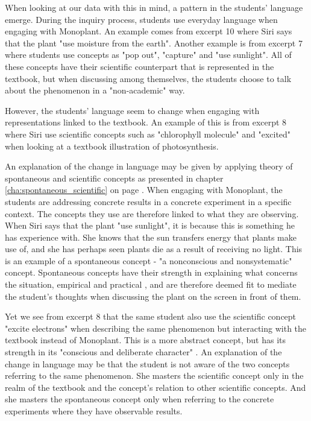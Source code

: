When looking at our data with this in mind, a pattern in the students' language emerge. During the inquiry process, students use everyday language when engaging with Monoplant. An example comes from excerpt 10 where Siri says that the plant "use moisture from the earth". Another example is from excerpt 7 where students use concepts as "pop out", "capture" and "use sunlight". All of these concepts have their scientific counterpart that is represented in the textbook, but when discussing among themselves, the students choose to talk about the phenomenon in a "non-academic" way. 

However, the students' language seem to change when engaging with representations linked to the textbook. An example of this is from excerpt 8 where Siri use scientific concepts such as "chlorophyll molecule" and "excited" when looking at a textbook illustration of photosynthesis. 

An explanation of the change in language may be given by applying \citet{vygotsky2012thought} theory of spontaneous and scientific concepts as presented in chapter \ref{cha:spontaneous_scientific} on page \pageref{cha:spontaneous_scientific}. When engaging with Monoplant, the students are addressing concrete results in a concrete experiment in a specific context. The concepts they use are therefore linked to what they are observing. When Siri says that the plant "use sunlight", it is because this is something he has experience with. She knows that the sun transfers energy that plants make use of, and she has perhaps seen plants die as a result of receiving no light. This is an example of a spontaneous concept \citep{vygotsky2012thought} - "a nonconscious and nonsystematic" concept. Spontaneous concepts have their strength in explaining what concerns the situation, empirical and practical \citep{vygotsky2012thought}, and are therefore deemed fit to mediate the student's thoughts when discussing the plant on the screen in front of them. 


Yet we see from excerpt 8 that the same student also use the scientific concept "excite electrons" when describing the same phenomenon but interacting with the textbook instead of Monoplant. This is a more abstract concept, but has its strength in its "conscious and deliberate character" \citep{vygotsky2012thought}. An explanation of the change in language may be that the student is not aware of the two concepts referring to the same phenomenon. She masters the scientific concept only in the realm of the textbook and the concept's relation to other scientific concepts. And she masters the spontaneous concept only when referring to the concrete experiments where they have observable results. 

